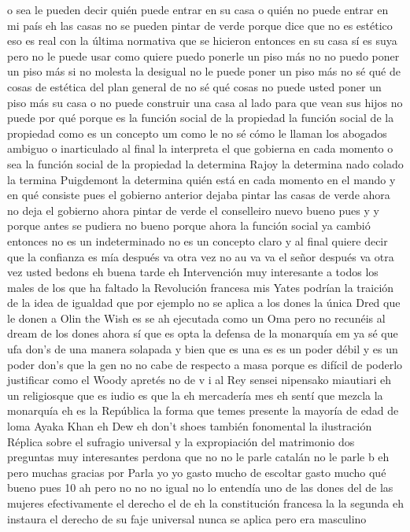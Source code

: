 o sea le pueden decir quién puede entrar en su casa o quién no puede entrar en mi país eh las casas no se pueden pintar de verde
porque dice que no es estético eso es real con la última normativa que se hicieron entonces en su casa sí es suya pero no le puede usar como quiere
puedo ponerle un piso más no no puedo poner un piso más si no molesta la desigual no le puede poner un piso más no sé qué de cosas de estética
del plan general de no sé qué cosas no puede usted poner un piso más su casa o no puede construir una casa al lado para que vean sus hijos
no puede por qué porque es la función social de la propiedad la función social de la propiedad como es un concepto um como le no sé cómo le llaman los abogados
ambiguo o inarticulado al final la interpreta el que gobierna en cada momento
o sea la función social de la propiedad la determina Rajoy la determina nado colado la termina Puigdemont la determina
quién está en cada momento en el mando y en qué consiste pues el gobierno anterior dejaba pintar las casas de verde ahora no deja
el gobierno ahora pintar de verde el conselleiro nuevo bueno pues y y porque antes se pudiera no
bueno porque ahora la función social ya cambió entonces no es un indeterminado no es un concepto claro
y al final quiere decir que la confianza es mía después va otra vez no au va
va el señor después va otra vez usted bedons eh buena tarde eh
Intervención
muy interesante a todos los males de los que ha faltado la Revolución francesa mis Yates podrían
la traición de la idea de igualdad que por ejemplo no se aplica a los dones la única Dred que le donen a Olin the Wish es
se ah ejecutada como un Oma pero no recunéis al dream de los dones ahora sí que es opta la defensa de la monarquía em
ya sé que ufa don's de una manera solapada y bien que es una es es un poder débil y es un poder don's que la gen no
no cabe de respecto a masa porque es difícil de poderlo justificar como el Woody apretés no de v i al Rey sensei nipensako miautiari
eh un religiosque que es iudio es que la eh mercadería mes eh sentí que mezcla la monarquía eh es la República
la forma que temes presente la mayoría de edad de loma Ayaka Khan eh Dew
eh don't shoes también fonomental la ilustración
Réplica sobre el sufragio universal y la expropiación del matrimonio
dos preguntas muy interesantes perdona que no no le parle catalán no le parle b eh pero muchas gracias por Parla
yo yo gasto mucho de escoltar gasto mucho qué bueno pues 10 ah pero no no no igual no lo entendía
uno de las dones del de las mujeres efectivamente el derecho el de eh
la constitución francesa la la segunda eh instaura el derecho de su faje universal nunca se aplica pero era masculino
